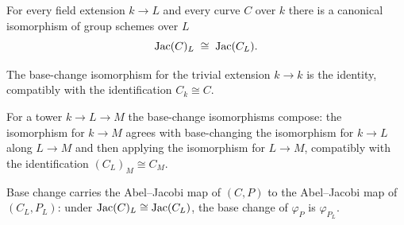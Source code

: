 \begin{theorem}
  \label{pa-thm:baseChangeIso}

  For every field extension \(k \to L\) and every curve \(C\) over \(k\) there is a canonical
  isomorphism of group schemes over \(L\)
  \[
    \mathrm{Jac}(C)_L \;\cong\; \mathrm{Jac}(C_L).
  \]
\end{theorem}

\begin{proposition}
  \label{pa-thm:baseChangeIso_id}

  The base-change isomorphism for the trivial extension \(k \to k\) is the identity, compatibly with
  the identification \(C_k \cong C\).
\end{proposition}

\begin{proposition}
  \label{pa-thm:baseChangeIso_comp}

  For a tower \(k \to L \to M\) the base-change isomorphisms compose: the isomorphism for \(k \to M\)
  agrees with base-changing the isomorphism for \(k \to L\) along \(L \to M\) and then applying the
  isomorphism for \(L \to M\), compatibly with the identification \((C_L)_M \cong C_M\).
\end{proposition}

\begin{proposition}
  \label{pa-thm:baseChange_ofCurve}

  Base change carries the Abel--Jacobi map of \((C, P)\) to the Abel--Jacobi map of \((C_L, P_L)\):
  under \(\mathrm{Jac}(C)_L \cong \mathrm{Jac}(C_L)\), the base change of \(\varphi_P\) is \(\varphi_{P_L}\).
\end{proposition}
